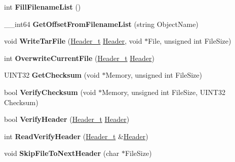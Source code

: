 \begin{DoxyCompactItemize}
\item 
\hypertarget{class_c_tar_ae8aa32f49aad569c5cb3bfe86a509f0f}{
int {\bfseries FillFilenameList} ()}
\label{class_c_tar_ae8aa32f49aad569c5cb3bfe86a509f0f}

\item 
\hypertarget{class_c_tar_aa357d0bf026ae53a552fdc96a2deef8d}{
\_\-\_\-int64 {\bfseries GetOffsetFromFilenameList} (string ObjectName)}
\label{class_c_tar_aa357d0bf026ae53a552fdc96a2deef8d}

\item 
\hypertarget{class_c_tar_a3714c1a94df1b33a210658062c22e82e}{
void {\bfseries WriteTarFile} (\hyperlink{struct_header}{Header\_\-t} \hyperlink{struct_header}{Header}, void $\ast$File, unsigned int FileSize)}
\label{class_c_tar_a3714c1a94df1b33a210658062c22e82e}

\item 
\hypertarget{class_c_tar_a2a3f09254ef1a05b1ec6c3e70679abaf}{
int {\bfseries OverwriteCurrentFile} (\hyperlink{struct_header}{Header\_\-t} \hyperlink{struct_header}{Header})}
\label{class_c_tar_a2a3f09254ef1a05b1ec6c3e70679abaf}

\item 
\hypertarget{class_c_tar_a3b14695f515ccbbea70e39873b60a617}{
UINT32 {\bfseries GetChecksum} (void $\ast$Memory, unsigned int FileSize)}
\label{class_c_tar_a3b14695f515ccbbea70e39873b60a617}

\item 
\hypertarget{class_c_tar_ab6dfb5df43713056ea20057319229b66}{
bool {\bfseries VerifyChecksum} (void $\ast$Memory, unsigned int FileSize, UINT32 Checksum)}
\label{class_c_tar_ab6dfb5df43713056ea20057319229b66}

\item 
\hypertarget{class_c_tar_af03a2b20f839e0d419f62f49bb88b857}{
bool {\bfseries VerifyHeader} (\hyperlink{struct_header}{Header\_\-t} \hyperlink{struct_header}{Header})}
\label{class_c_tar_af03a2b20f839e0d419f62f49bb88b857}

\item 
\hypertarget{class_c_tar_aaedef8cb03dc83687b252708a4707bbb}{
int {\bfseries ReadVerifyHeader} (\hyperlink{struct_header}{Header\_\-t} \&\hyperlink{struct_header}{Header})}
\label{class_c_tar_aaedef8cb03dc83687b252708a4707bbb}

\item 
\hypertarget{class_c_tar_a1f6df09773f21d35e3c52f728a8b5843}{
void {\bfseries SkipFileToNextHeader} (char $\ast$FileSize)}
\label{class_c_tar_a1f6df09773f21d35e3c52f728a8b5843}


\end{DoxyCompactItemize}
